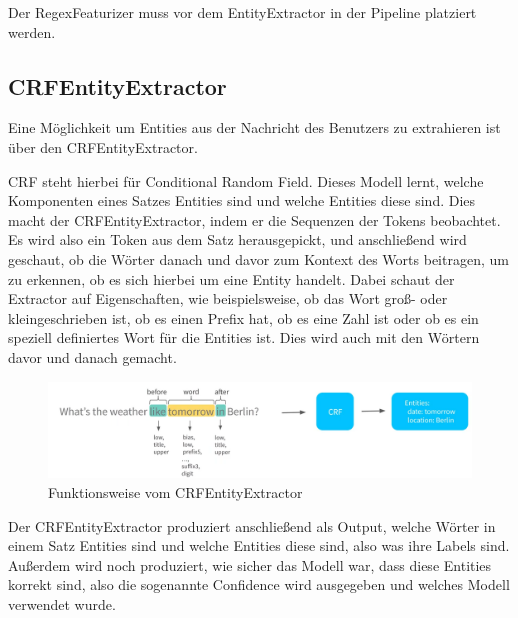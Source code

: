 Der RegexFeaturizer muss vor dem EntityExtractor in der Pipeline platziert werden.\cite{rasaMasterclassRegexFeaturizer, pipelineComponentsYoutube, regexFeaturizerCrf}

\subsection{CRFEntityExtractor}

Eine Möglichkeit um Entities aus der Nachricht des Benutzers zu extrahieren ist über den CRFEntityExtractor.\cite{crfEntityExtractor}

CRF steht hierbei für Conditional Random Field.
Dieses Modell lernt, welche Komponenten eines Satzes Entities sind und welche Entities diese sind.\cite{crfEntityExtractor, pipelineComponentsYoutube, regexFeaturizerCrf}
\ci
Dies macht der CRFEntityExtractor, indem er die Sequenzen der Tokens beobachtet.
Es wird also ein Token aus dem Satz herausgepickt, und anschließend wird geschaut, ob die Wörter danach und davor zum Kontext des Worts beitragen, um zu erkennen, ob es sich hierbei um eine Entity handelt.
Dabei schaut der Extractor auf Eigenschaften, wie beispielsweise, ob das Wort groß- oder kleingeschrieben ist, ob es einen Prefix hat, ob es eine Zahl ist oder ob es ein speziell definiertes Wort für die Entities ist.
Dies wird auch mit den Wörtern davor und danach gemacht.\cite{crfEntityExtractor, pipelineComponentsYoutube, regexFeaturizerCrf}

\begin{figure}[hbt!]
  \centering
  \includegraphics[scale=0.4]{pics/crf-entity-extractor}
  \caption{Funktionsweise vom CRFEntityExtractor~\cite{pipelineComponentsYoutube}}
  \label{fig:CRFEntityExtractor}
\end{figure}

Der CRFEntityExtractor produziert anschließend als Output, welche Wörter in einem Satz Entities sind und welche Entities diese sind, also was ihre Labels sind.
Außerdem wird noch produziert, wie sicher das Modell war, dass diese Entities korrekt sind, also die sogenannte Confidence wird ausgegeben und welches Modell verwendet wurde.\cite{crfEntityExtractor, pipelineComponentsYoutube, regexFeaturizerCrf}

